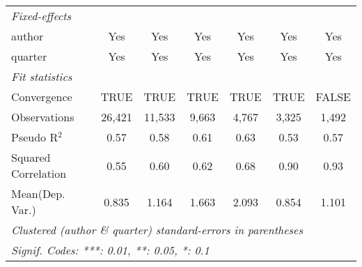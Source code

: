 \begin{tabular}{lcccccc}
   \midrule
   \emph{Fixed-effects}\\
   author                                                     & Yes            & Yes           & Yes            & Yes            & Yes            & Yes\\  
   quarter                                                    & Yes            & Yes           & Yes            & Yes            & Yes            & Yes\\  
   \midrule
   \emph{Fit statistics}\\
   Convergence                                                &TRUE            & TRUE          & TRUE           & TRUE           & TRUE           & FALSE\\  
   Observations                                               & 26,421         & 11,533        & 9,663          & 4,767          & 3,325          & 1,492\\  
   Pseudo R$^2$                                               & 0.57           & 0.58          & 0.61           & 0.63           & 0.53           & 0.57\\  
   Squared Correlation                                        & 0.55           & 0.60          & 0.62           & 0.68           & 0.90           & 0.93\\  
Mean(Dep. Var.) & 0.835 & 1.164 & 1.663 & 2.093 & 0.854 & 1.101 \\
   \midrule \midrule
   \multicolumn{7}{l}{\emph{Clustered (author \& quarter) standard-errors in parentheses}}\\
   \multicolumn{7}{l}{\emph{Signif. Codes: ***: 0.01, **: 0.05, *: 0.1}}\\
\end{tabular}
\par\endgroup
